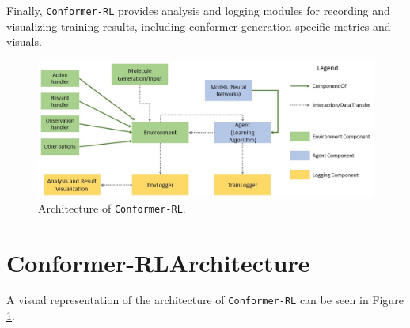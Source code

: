 \documentclass[twoside,11pt]{article}
\newcommand{\code}[1]{\texttt{#1}}
\newcommand{\titleofpaper}{Conformer-RL}
\newcommand{\genComment}[2]{\ifnum\comments=1{\color{#1}{\textsf{\footnotesize #2}}}\fi}
\newcommand{\tarun}[1] {\genComment{blue}{[TG: #1]}}
\newcommand{\paul}[1]{\genComment{brown}{[PZ:#1]}}
\newcommand{\runxuan}[1]{\genComment{pink}{[RJ:#1]}}
\begin{document}
Finally, \code{\titleofpaper} provides analysis and logging modules for recording and visualizing training results, including conformer-generation specific metrics and visuals.

\begin{figure}[h]
  \centering
  \includegraphics[width=\textwidth]{architectures.jpg}
  \caption{Architecture of \code{\titleofpaper}. 
  }
  \label{fig:architecture}
\end{figure}

\section{\titleofpaper \space Architecture}
  A visual representation of the architecture of \code{\titleofpaper} can be seen in Figure \ref{fig:architecture}.
\end{document}
